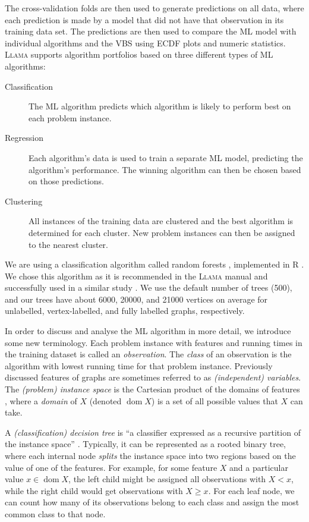 \documentclass{l4proj}
\theoremstyle{definition}
\theoremstyle{remark}
\DeclareMathOperator{\dom}{dom}
\begin{document}
The cross-validation folds are then used to generate predictions on all data,
where each prediction is made by a model that did not have that observation in
its training data set. The predictions are then used to compare the ML model with
individual algorithms and the VBS using ECDF plots and numeric statistics.
\textsc{Llama} \cite{kotthoff_llama_2013, llama} supports algorithm portfolios
based on three different types of ML algorithms:

\begin{description}
  \item[Classification] The ML algorithm predicts which algorithm is likely to
    perform best on each problem instance.
  \item[Regression] Each algorithm's data is used to train a separate ML model,
    predicting the algorithm's performance. The winning algorithm can then be
    chosen based on those predictions.
  \item[Clustering] All instances of the training data are clustered and the
    best algorithm is determined for each cluster. New problem instances can
    then be assigned to the nearest cluster.
\end{description}

We are using a classification algorithm called random forests
\cite{DBLP:journals/ml/Breiman01}, implemented in R \cite{randomforest}. We
chose this algorithm as it is recommended in the \textsc{Llama} manual
\cite{kotthoff_llama_2013} and successfully used in a similar study
\cite{DBLP:conf/lion/KotthoffMS16}. We use the default number of trees (500),
and our trees have about \num{6000}, \num{20000}, and \num{21000} vertices on
average for unlabelled, vertex-labelled, and fully labelled graphs,
respectively.

In order to discuss and analyse the ML algorithm in more detail, we introduce
some new terminology. Each problem instance with features and running times in
the training dataset is called an \emph{observation}. The \emph{class} of an
observation is the algorithm with lowest running time for that problem instance.
Previously discussed features of graphs are sometimes referred to as
\emph{(independent) variables}. The \emph{(problem) instance space} is the
Cartesian product of the domains of features \cite{DBLP:series/smpai/RokachM14},
where a \emph{domain} of $X$ (denoted $\dom X$) is a set of all possible values
that $X$ can take.

A \emph{(classification) decision tree} is ``a classifier expressed as a
recursive partition of the instance space'' \cite{DBLP:series/smpai/RokachM14}.
Typically, it can be represented as a rooted binary tree, where each internal
node \emph{splits} the instance space into two regions based on the value of one
of the features. For example, for some feature $X$ and a particular value $x \in
\dom{X}$, the left child might be assigned all observations with $X < x$, while
the right child would get observations with $X \ge x$. For each leaf node, we
can count how many of its observations belong to each class and assign the most
common class to that node.
\end{document}
